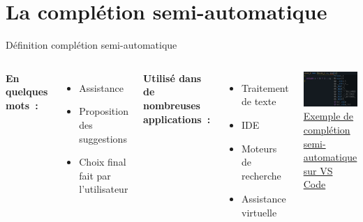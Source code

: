 
\section{La complétion semi-automatique}

\begin{frame}{Définition complétion semi-automatique}
	\begin{columns}
		
		\textbf{En quelques mots~:}
		\begin{itemize}
			\item Assistance
			\item Proposition des suggestions
			\item Choix final fait par l'utilisateur
		\end{itemize}
		\vfill	
		\textbf{Utilisé dans de nombreuses applications~:}
		\begin{itemize}
			\item Traitement de texte
			\item IDE
			\item Moteurs de recherche
			\item Assistance virtuelle
		\end{itemize}
		\includegraphics[width=\textwidth]{images/exemple_completion_semi_auto.png}
		\centering
		\uline{Exemple de complétion semi-automatique sur VS Code}
		
	\end{columns}
\end{frame}


